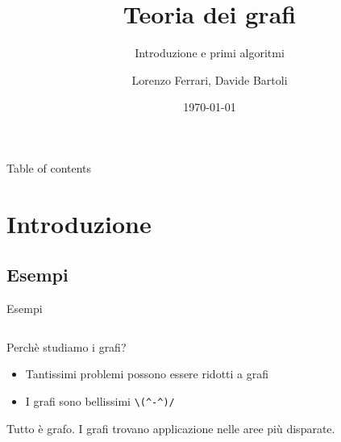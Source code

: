 \documentclass[compress]{beamer}
\title{Teoria dei grafi}
\subtitle{Introduzione e primi algoritmi}
\author{Lorenzo Ferrari, Davide Bartoli}
\date{\today}
\begin{document}
\begin{frame}
  \maketitle
\end{frame}

\begin{frame}{Table of contents}
  \tableofcontents
\end{frame}


\section{Introduzione}

\subsection{Esempi}

\begin{frame}{Esempi}
  \begin{columns}
    \begin{center}
    \scalebox{0.7}{}
    \end{center}
    \begin{center}
    \scalebox{0.7}{}
    \end{center}
    \begin{center}
    \scalebox{0.7}{}
    \end{center}
    \begin{center}
    \scalebox{0.7}{}
    \end{center}
  \end{columns}
\end{frame}

\begin{frame}[fragile]{Perch\`e studiamo i grafi?}
  \begin{alertblock}{}
    \begin{itemize}
    \item Tantissimi problemi possono essere ridotti a grafi
    \item I grafi sono bellissimi \verb|\(^-^)/|
    \end{itemize}
  \end{alertblock}
  \pause
  Tutto \`e grafo. I grafi trovano applicazione nelle aree pi\`u disparate.
\end{frame}
\end{document}
